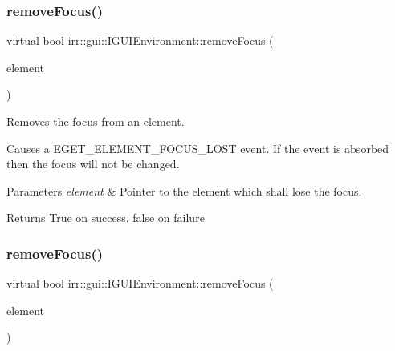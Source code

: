 \subsubsection{\texorpdfstring{remove\+Focus()}{removeFocus()}\hspace{0.1cm}{\footnotesize\ttfamily [1/2]}}
{\footnotesize\ttfamily virtual bool irr\+::gui\+::\+I\+G\+U\+I\+Environment\+::remove\+Focus (\begin{DoxyParamCaption}\item[{\hyperlink{classirr_1_1gui_1_1IGUIElement}{I\+G\+U\+I\+Element} $\ast$}]{element }\end{DoxyParamCaption})\hspace{0.3cm}{\ttfamily [pure virtual]}}



Removes the focus from an element. 

Causes a E\+G\+E\+T\+\_\+\+E\+L\+E\+M\+E\+N\+T\+\_\+\+F\+O\+C\+U\+S\+\_\+\+L\+O\+ST event. If the event is absorbed then the focus will not be changed. 
\begin{DoxyParams}{Parameters}
{\em element} & Pointer to the element which shall lose the focus. \\
\hline
\end{DoxyParams}
\begin{DoxyReturn}{Returns}
True on success, false on failure 
\end{DoxyReturn}
\mbox{\label{classirr_1_1gui_1_1IGUIEnvironment_ab2100753b415a9950d95572d4623bf46}} 
\subsubsection{\texorpdfstring{remove\+Focus()}{removeFocus()}\hspace{0.1cm}{\footnotesize\ttfamily [2/2]}}
{\footnotesize\ttfamily virtual bool irr\+::gui\+::\+I\+G\+U\+I\+Environment\+::remove\+Focus (\begin{DoxyParamCaption}\item[{\hyperlink{classirr_1_1gui_1_1IGUIElement}{I\+G\+U\+I\+Element} $\ast$}]{element }\end{DoxyParamCaption})\hspace{0.3cm}{\ttfamily [pure virtual]}}



